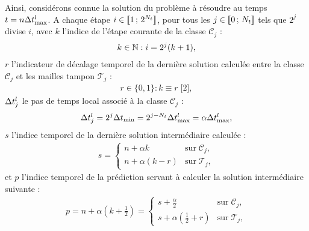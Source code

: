Ainsi, considérons connue la solution du problème à résoudre
au temps $t = n \Delta t^l_{\max}$.
A chaque étape $i \in \lbrack\!\lbrack1\,;\,2^{N_t}\rbrack\!\rbrack$,
pour tous les $j \in \lbrack\!\lbrack0\,;\,N_t\rbrack\!\rbrack$ tels que $2^j$ divise $i$,
avec $k$ l'indice de l'étape courante de la classe $\mathcal{C}_j$ :
\begin{align}
	k \in \mathbb{N} : i = 2^j (k+1) ,
\end{align}
$r$ l'indicateur de décalage temporel de la dernière solution calculée
entre la classe $\mathcal{C}_j$ et les mailles tampon $\mathcal{T}_j$ :
\begin{align}
	r \in \lbrace 0 , 1 \rbrace : k \equiv r \; \lbrack 2 \rbrack ,
\end{align}
$\Delta t^l_j$ le pas de temps local associé à la classe $\mathcal{C}_j$ :
\begin{align}
	\Delta t^l_j = 2^j \Delta t_{\min} = 2^{j-N_t} \Delta t^l_{\max} = \alpha \Delta t^l_{\max} ,
\end{align}
$s$ l'indice temporel de la dernière solution intermédiaire calculée :
\begin{align}
	s =
	\begin{cases}
		n + \alpha k & \mathrm{sur} \; \mathcal{C}_j , \\
		n + \alpha (k - r) & \mathrm{sur} \; \mathcal{T}_j ,
	\end{cases}
\end{align}
et $p$ l'indice temporel de la prédiction servant à calculer la solution
intermédiaire suivante :
\begin{align}
	p = n + \alpha \left( k + \frac{1}{2} \right) =
	\begin{cases}
		s + \frac{\alpha}{2} & \mathrm{sur} \; \mathcal{C}_j , \\
		s + \alpha \left( \frac{1}{2} + r \right) & \mathrm{sur} \; \mathcal{T}_j ,
	\end{cases}
\end{align}
